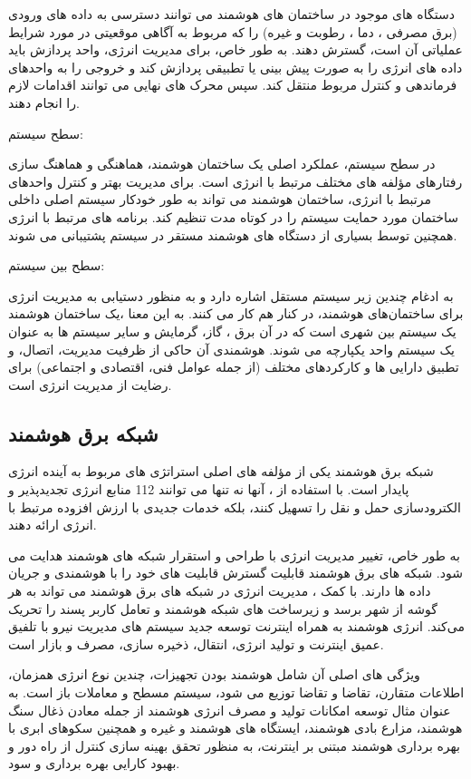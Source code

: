 دستگاه های موجود در ساختمان های هوشمند می توانند دسترسی به داده های ورودی (برق مصرفی ، دما ، رطوبت و غیره) را که مربوط به آگاهی موقعیتی در مورد شرایط عملیاتی آن است، گسترش دهند. به طور خاص، برای مدیریت انرژی، واحد پردازش  باید داده های انرژی را به صورت پیش بینی یا تطبیقی پردازش کند و خروجی را به واحدهای فرماندهی و کنترل مربوط منتقل کند. سپس محرک های نهایی می توانند اقدامات لازم را انجام دهند.


سطح سیستم:

در سطح سیستم، عملکرد اصلی یک ساختمان هوشمند، هماهنگی و هماهنگ سازی رفتارهای مؤلفه های مختلف مرتبط با انرژی است. برای مدیریت بهتر و کنترل واحدهای مرتبط با انرژی، ساختمان هوشمند می تواند به طور خودکار سیستم اصلی داخلی ساختمان مورد حمایت سیستم را در کوتاه مدت تنظیم کند. برنامه های مرتبط با انرژی همچنین توسط بسیاری از دستگاه های هوشمند  مستقر در سیستم پشتیبانی می شوند.


سطح بین سیستم:

به ادغام چندین زیر سیستم مستقل اشاره دارد و به منظور دستیابی به مدیریت انرژی برای ساختمان‌های هوشمند، در کنار هم کار می کنند. به این معنا ،یک ساختمان هوشمند یک سیستم بین شهری است که در آن برق ، گاز، گرمایش و سایر سیستم ها به عنوان یک سیستم واحد یکپارچه می شوند. هوشمندی آن حاکی از ظرفیت مدیریت، اتصال، و تطبیق دارایی ها و کارکردهای مختلف (از جمله عوامل فنی، اقتصادی و اجتماعی) برای رضایت از مدیریت انرژی است.


\subsection{شبکه برق هوشمند}
شبکه برق هوشمند یکی از مؤلفه های اصلی استراتژی های مربوط به آینده انرژی پایدار است. با استفاده از ، آنها نه تنها می توانند 112 منابع انرژی تجدیدپذیر و الکترودسازی حمل و نقل را تسهیل کنند، بلکه خدمات جدیدی با ارزش افزوده مرتبط با انرژی ارائه دهند.

به طور خاص، تغییر مدیریت انرژی با طراحی و استقرار شبکه های هوشمند هدایت می شود. شبکه های برق هوشمند قابلیت گسترش قابلیت های خود را با هوشمندی و جریان داده ها دارند. با کمک ، مدیریت انرژی در شبکه های برق هوشمند می تواند به هر گوشه از شهر برسد و زیرساخت های شبکه هوشمند و تعامل کاربر پسند را تحریک می‌کند.
انرژی هوشمند به همراه اینترنت توسعه جدید سیستم های مدیریت نیرو با تلفیق عمیق اینترنت و تولید انرژی، انتقال، ذخیره سازی، مصرف و بازار است.

ویژگی های اصلی آن شامل هوشمند بودن تجهیزات، چندین نوع انرژی همزمان، اطلاعات متقارن، تقاضا و تقاضا توزیع می شود، سیستم مسطح و معاملات باز است. به عنوان مثال توسعه امکانات تولید و مصرف انرژی هوشمند از جمله معادن ذغال سنگ هوشمند، مزارع بادی هوشمند، ایستگاه های  هوشمند و غیره و همچنین سکوهای ابری با بهره برداری هوشمند مبتنی بر اینترنت، به منظور تحقق بهینه سازی کنترل از راه دور و بهبود کارایی بهره برداری و سود.


